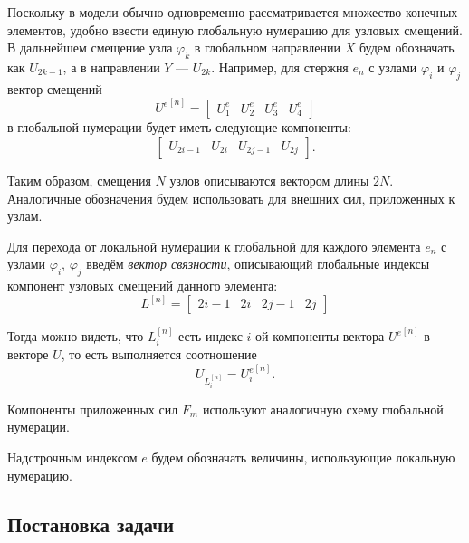 \documentclass[10pt]{article}
\numberwithin{equation}{section}
\renewcommand{\phi}{\varphi}
\newcommand{\neword}{\emph}
\newcommand{\node}[1]{$\phi_{#1}$}
\newcommand{\element}[1]{$e_{#1}$}
\begin{document}
Поскольку в модели обычно одновременно рассматривается множество
конечных элементов, удобно ввести единую глобальную нумерацию для
узловых смещений. В дальнейшем смещение узла \node{k} в глобальном
направлении $X$ будем обозначать как $U_{2k-1}$, а в направлении $Y$ —
$U_{2k}$. Например, для стержня \element{n} с узлами \node{i} и \node{j} вектор
смещений
\begin{equation*}
  {U^e}^{[n]}=
  \begin{bmatrix}
    U_1^e & U_2^e & U_3^e & U_4^e
  \end{bmatrix}
\end{equation*}
в глобальной нумерации будет иметь следующие компоненты:
\begin{equation}
  \label{eq:global-numbering}
  \begin{bmatrix}
    U_{2i-1} & U_{2i} & U_{2j-1} & U_{2j}
  \end{bmatrix}.
\end{equation}
 
Таким образом, смещения $N$ узлов описываются вектором длины $2N$.
Аналогичные обозначения будем использовать для внешних сил,
приложенных к узлам.

Для перехода от локальной нумерации к глобальной для каждого элемента
\element{n} с узлами \node{i}, \node{j} введём \neword{вектор
  связности}, описывающий глобальные индексы компонент узловых
смещений данного элемента:
\begin{equation}
  \label{eq:glob-num-vector}
  L^{[n]} =
  \begin{bmatrix}
    2i-1 & 2i & 2j-1 & 2j
  \end{bmatrix}
\end{equation}

Тогда можно видеть, что $L_i^{[n]}$ есть индекс $i$-ой компоненты
вектора ${U^e}^{[n]}$ в векторе $U$, то есть выполняется соотношение
\begin{equation}
  \label{eq:num-vector-transform}
  U_{L_i^{[n]}} = {U_i^e}^{[n]}.
\end{equation}

Компоненты приложенных сил $F_m$ используют аналогичную схему
глобальной нумерации.

Надстрочным индексом $e$ будем обозначать величины, использующие локальную
нумерацию.

\subsection{Постановка задачи}
\end{document}
